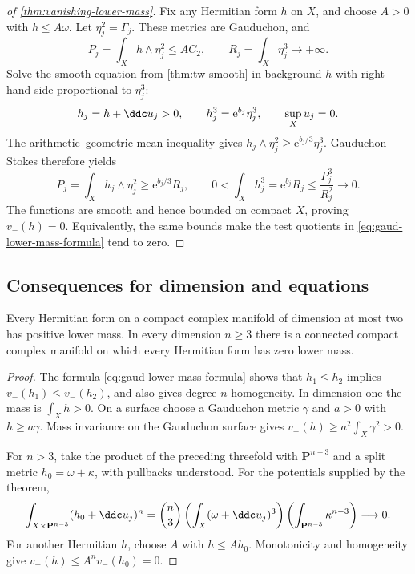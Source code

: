 \begin{proof}[of \cref{thm:vanishing-lower-mass}]
Fix any Hermitian form $h$ on $X$, and choose $A>0$ with $h\leq A\omega$. Let $\eta_j^2=\Gamma_j$. These metrics are Gauduchon, and
\[
 P_j=\int_Xh\wedge\eta_j^2\leq AC_2,\qquad
 R_j=\int_X\eta_j^3\longrightarrow+\infty.
\]
Solve the smooth equation from \cref{thm:tw-smooth} in background $h$ with right-hand side proportional to $\eta_j^3$:
\[
 h_j=h+\ddc u_j>0,\qquad h_j^3=\mathrm{e}^{b_j}\eta_j^3,
 \qquad \sup_Xu_j=0.
\]
The arithmetic--geometric mean inequality gives
$h_j\wedge\eta_j^2\geq\mathrm{e}^{b_j/3}\eta_j^3$.
Gauduchon Stokes therefore yields
\[
 P_j=\int_Xh_j\wedge\eta_j^2\geq\mathrm{e}^{b_j/3}R_j,
 \qquad
 0<\int_Xh_j^3=\mathrm{e}^{b_j}R_j
       \leq\frac{P_j^3}{R_j^2}\longrightarrow0.
\]
The functions are smooth and hence bounded on compact $X$, proving $v_-(h)=0$. Equivalently, the same bounds make the test quotients in \eqref{eq:gaud-lower-mass-formula} tend to zero.
\end{proof}

\subsection{Consequences for dimension and equations}

\begin{corollary}\label{cor:lower-mass-dimension}
Every Hermitian form on a compact complex manifold of dimension at most two has positive lower mass. In every dimension $n\geq3$ there is a connected compact complex manifold on which every Hermitian form has zero lower mass.
\end{corollary}
\begin{proof}
The formula \eqref{eq:gaud-lower-mass-formula} shows that $h_1\leq h_2$ implies $v_-(h_1)\leq v_-(h_2)$, and also gives degree-$n$ homogeneity. In dimension one the mass is $\int_Xh>0$. On a surface choose a Gauduchon metric $\gamma$ and $a>0$ with $h\geq a\gamma$. Mass invariance on the Gauduchon surface gives
$v_-(h)\geq a^2\int_X\gamma^2>0$.

For $n>3$, take the product of the preceding threefold with $\mathbf P^{n-3}$ and a split metric $h_0=\omega+\kappa$, with pullbacks understood. For the potentials supplied by the theorem,
\[
 \int_{X\times\mathbf P^{n-3}}(h_0+\ddc u_j)^n
 =\binom n3\left(\int_X(\omega+\ddc u_j)^3\right)
                   \left(\int_{\mathbf P^{n-3}}\kappa^{n-3}\right)
 \longrightarrow0.
\]
For another Hermitian $h$, choose $A$ with $h\leq Ah_0$. Monotonicity and homogeneity give $v_-(h)\leq A^n v_-(h_0)=0$.
\end{proof}

